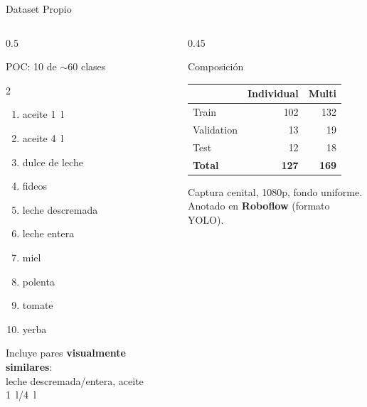 \documentclass[aspectratio=169,10pt]{beamer}
\begin{document}
\begin{frame}{Dataset Propio}
  \begin{columns}[T]
    \begin{column}{0.5\textwidth}
      \begin{block}{POC: 10 de $\sim$60 clases}
        \small
        \begin{multicols}{2}
          \begin{enumerate}
            \item aceite 1~l
            \item aceite 4~l
            \item dulce de leche
            \item fideos
            \item leche descremada
            \item leche entera
            \item miel
            \item polenta
            \item tomate
            \item yerba
          \end{enumerate}
        \end{multicols}
      \end{block}
      \vspace{0.2cm}
      Incluye pares \textbf{visualmente similares}:\\
      leche descremada/entera, aceite 1~l/4~l
    \end{column}
    \begin{column}{0.45\textwidth}
      \begin{block}{Composición}
        \centering
        \begin{tabular}{lrr}
          \toprule
                     & \textbf{Individual} & \textbf{Multi} \\
          \midrule
          Train      & 102   & 132  \\
          Validation & 13    & 19   \\
          Test       & 12    & 18   \\
          \midrule
          \textbf{Total} & \textbf{127} & \textbf{169} \\
          \bottomrule
        \end{tabular}
      \end{block}
      \vspace{0.2cm}
      \small
      Captura cenital, 1080p, fondo uniforme.\\
      Anotado en \textbf{Roboflow} (formato YOLO).
    \end{column}
  \end{columns}
\end{frame}
\end{document}
